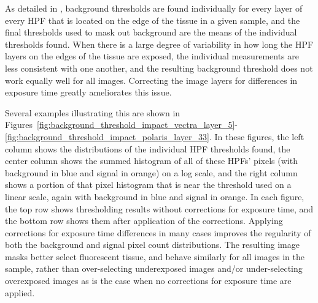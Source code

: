 \documentclass[letterpaper,11pt]{article}
\begin{document}
As detailed in \cite{flatfielding_note}, background thresholds are found individually for every layer of every HPF that is located on the edge of the tissue in a given sample, and the final thresholds used to mask out background are the means of the individual thresholds found. When there is a large degree of variability in how long the HPF layers on the edges of the tissue are exposed, the individual measurements are less consistent with one another, and the resulting background threshold does not work equally well for all images. Correcting the image layers for differences in exposure time greatly ameliorates this issue.

Several examples illustrating this are shown in Figures~\ref{fig:background_threshold_impact_vectra_layer_5}-\ref{fig:background_threshold_impact_polaris_layer_33}. In these figures, the left column shows the distributions of the individual HPF thresholds found, the center column shows the summed histogram of all of these HPFs' pixels (with background in blue and signal in orange) on a log scale, and the right column shows a portion of that pixel histogram that is near the threshold used on a linear scale, again with background in blue and signal in orange. In each figure, the top row shows thresholding results without corrections for exposure time, and the bottom row shows them after application of the corrections. Applying corrections for exposure time differences in many cases improves the regularity of both the background and signal pixel count distributions. The resulting image masks better select fluorescent tissue, and behave similarly for all images in the sample, rather than over-selecting underexposed images and/or under-selecting overexposed images as is the case when no corrections for exposure time are applied.
\end{document}
